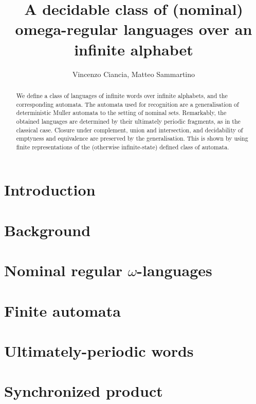 \documentclass[orivec]{llncs}
\title{A decidable class of (nominal) omega-regular languages over an infinite alphabet}
\author{Vincenzo Ciancia, Matteo Sammartino}
\institute{}
\begin{document}
\maketitle

\begin{abstract}
 We define a class of languages of infinite words over infinite alphabets, and the corresponding automata. The automata used for recognition are a generalisation of deterministic Muller automata to the setting of nominal sets. Remarkably, the obtained languages are determined by their ultimately periodic fragments, as in the classical case. Closure under complement, union and intersection, and decidability of emptyness and equivalence are preserved by the generalisation. This is shown by using finite representations of the (otherwise infinite-state) defined class of automata.
\end{abstract}

\section{Introduction}\label{sec:introduction}

\section{Background}\label{sec:background}

\section{Nominal regular $\omega$-languages}\label{sec:languages}


\section{Finite automata}\label{sec:hd-automata}



\section{Ultimately-periodic words}\label{sec:up-determinacy}

\section{Synchronized product}\label{sec:sync-product}

\end{document}
